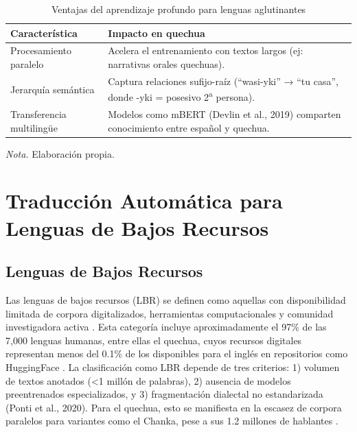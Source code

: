         \begin{table}[h!]
            \centering
            \caption{Ventajas del aprendizaje profundo para lenguas aglutinantes}
            \begin{tabularx}{\textwidth}{|l|X|}
            \hline
            \textbf{Característica} & \textbf{Impacto en quechua} \\
            \hline
            Procesamiento paralelo & Acelera el entrenamiento con textos largos (ej: narrativas orales quechuas). \\
            \hline
            Jerarquía semántica & Captura relaciones sufijo-raíz (``wasi-yki'' → ``tu casa'', donde -yki = posesivo 2\textsuperscript{a} persona). \\
            \hline
            Transferencia multilingüe & Modelos como mBERT (Devlin et al., 2019) comparten conocimiento entre español y quechua. \\
            \hline
            \end{tabularx}
            \label{tab:aglutinantes_quechua}
            \vspace{0.5em}
            \textit{Nota.} Elaboración propia.
        \end{table}

        
    \section{Traducción Automática para Lenguas de Bajos Recursos}
        \subsection{Lenguas de Bajos Recursos}
        Las lenguas de bajos recursos (LBR) se definen como aquellas con disponibilidad limitada de corpora digitalizados, herramientas computacionales y comunidad investigadora activa \cite{joshi2020state}. Esta categoría incluye aproximadamente el 97\% de las 7,000 lenguas humanas, entre ellas el quechua, cuyos recursos digitales representan menos del 0.1\% de los disponibles para el inglés en repositorios como HuggingFace \cite{fernandez2025redefining}. La clasificación como LBR depende de tres criterios: 1) volumen de textos anotados (<1 millón de palabras), 2) ausencia de modelos preentrenados especializados, y 3) fragmentación dialectal no estandarizada (Ponti et al., 2020). Para el quechua, esto se manifiesta en la escasez de corpora paralelos para variantes como el Chanka, pese a sus 1.2 millones de hablantes \cite{adelaar2004}.
        
